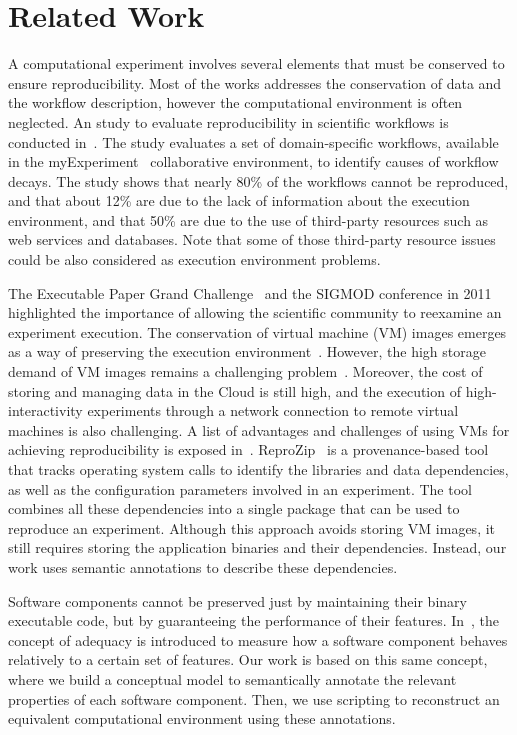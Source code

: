 \section{Related Work}
\label{sec:related-work}

A computational experiment involves several elements that must be conserved to ensure reproducibility. Most of the works addresses the conservation of data and the workflow description, however the computational environment is often neglected. 
An study to evaluate reproducibility in scientific workflows is conducted in~\cite{zhao2012}. The study evaluates a set of domain-specific workflows, available in the myExperiment~\cite{myExperiment} collaborative environment, to identify causes of workflow decays. The study shows that nearly 80\% of the workflows cannot be reproduced, and that about 12\% are due to the lack of information about the execution environment, and that 50\% are due to the use of third-party resources such as web services and databases. Note that some of those third-party resource issues could be also considered as execution environment problems. 

The Executable Paper Grand Challenge~\cite{elsevierchallenge} and the SIGMOD conference in 2011~\cite{SIGMOD} highlighted the importance of allowing the scientific community to reexamine an experiment execution. The conservation of virtual machine (VM) images emerges as a way of preserving the execution environment~\cite{Brammer,SHARE}. However, the high storage demand of VM images remains a challenging problem~\cite{Mao:2014:ROD:2600090.2512348,6552826}. Moreover, the cost of storing and managing data in the Cloud is still high, and the execution of high-interactivity experiments through a network connection to remote virtual machines is also challenging. A list of advantages and challenges of using VMs for achieving reproducibility is exposed in~\cite{Howe2012}. ReproZip~\cite{reprozip} is a provenance-based tool that tracks operating system calls to identify the libraries and data dependencies, as well as the configuration parameters involved in an experiment. The tool combines all these dependencies into a single package that can be used to reproduce an experiment. Although this approach avoids storing VM images, it still requires storing the application binaries and their dependencies. Instead, our work uses semantic annotations to describe these dependencies.

Software components cannot be preserved just by maintaining their binary executable code, but by guaranteeing the performance of their features. In~\cite{Matthews}, the concept of adequacy is introduced to measure how a software component behaves relatively to a certain set of features. Our work is based on this same concept, where we build a conceptual model to semantically annotate the relevant properties of each software component. Then, we use scripting to reconstruct an equivalent computational environment using these annotations.


